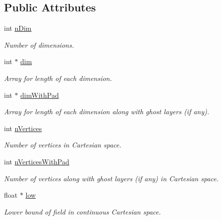 \subsection*{Public Attributes}
\begin{DoxyCompactItemize}
\item 
int \hyperlink{classITL__grid_a81b6e8bd7659d7ffaafe0990351a5d22}{nDim}
\begin{DoxyCompactList}\small\item\em Number of dimensions. \item\end{DoxyCompactList}\item 
int $\ast$ \hyperlink{classITL__grid_a90ea972d6b2a9ce6e895bde21943e75d}{dim}
\begin{DoxyCompactList}\small\item\em Array for length of each dimension. \item\end{DoxyCompactList}\item 
int $\ast$ \hyperlink{classITL__grid_aa5c2e652215db2cbba916fdaab3e0bfb}{dimWithPad}
\begin{DoxyCompactList}\small\item\em Array for length of each dimension along with ghost layers (if any). \item\end{DoxyCompactList}\item 
int \hyperlink{classITL__grid_a21d38f7628465b0638ebd60f0fa11e7d}{nVertices}
\begin{DoxyCompactList}\small\item\em Number of vertices in Cartesian space. \item\end{DoxyCompactList}\item 
int \hyperlink{classITL__grid_a152743e564ed5b265c62c8462507e033}{nVerticesWithPad}
\begin{DoxyCompactList}\small\item\em Number of vertices along with ghost layers (if any) in Cartesian space. \item\end{DoxyCompactList}\item 
float $\ast$ \hyperlink{classITL__grid_abdab084ddf12b7bf745a4b76201757bf}{low}
\begin{DoxyCompactList}\small\item\em Lower bound of field in continuous Cartesian space. \item\end{DoxyCompactList}\item 

\end{DoxyCompactItemize}
